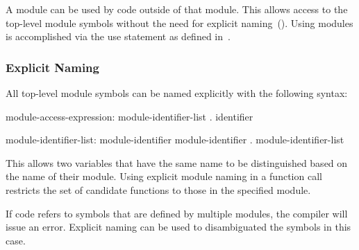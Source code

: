 A module can be used by code outside of that module.  This allows
access to the top-level module symbols without the need for explicit
naming~().  Using modules is accomplished via
the use statement as defined in~.

\subsubsection{Explicit Naming}
\label{Explicit_Naming}

All top-level module symbols can be named explicitly with the
following syntax:
\begin{syntax}
module-access-expression:
  module-identifier-list . identifier

module-identifier-list:
  module-identifier
  module-identifier . module-identifier-list

\end{syntax}
This allows two variables that have the same name to be distinguished
based on the name of their module.  Using explicit module naming in a
function call restricts the set of candidate functions to those in the
specified module.

If code refers to symbols that are defined by multiple modules, the
compiler will issue an error.  Explicit naming can be used to
disambiguated the symbols in this case.

